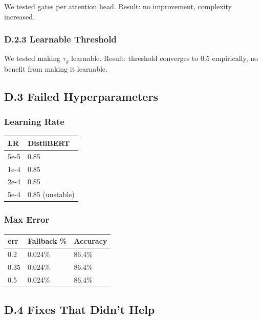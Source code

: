 We tested gates per attention head. Result: no improvement, complexity 
increased.

\subsubsection{D.2.3 Learnable Threshold}

We tested making $\tau_g$ learnable. Result: threshold converges to 0.5 
empirically, no benefit from making it learnable.

\subsection{D.3 Failed Hyperparameters}

\subsubsection{Learning Rate}

\begin{table}[H]
\centering
\small
\begin{tabular}{ll}
\toprule
\textbf{LR} & \textbf{DistilBERT} \\
\midrule
5e-5 & 0.85 \\
1e-4 & 0.85 \\
2e-4 & 0.85 \\
5e-4 & 0.85 (unstable) \\
\bottomrule
\end{tabular}
\end{table}

\subsubsection{Max Error}

\begin{table}[H]
\centering
\small
\begin{tabular}{lll}
\toprule
\textbf{err} & \textbf{Fallback \%} & \textbf{Accuracy} \\
\midrule
0.2 & 0.024\% & 86.4\% \\
0.35 & 0.024\% & 86.4\% \\
0.5 & 0.024\% & 86.4\% \\
\bottomrule
\end{tabular}
\end{table}

\subsection{D.4 Fixes That Didn't Help}

